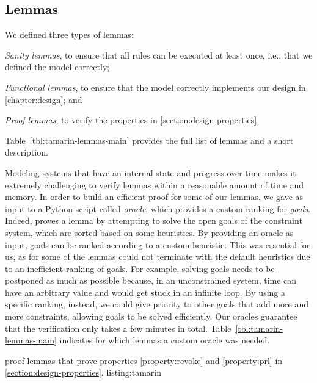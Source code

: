 \subsection{Lemmas}
\label{section:tamarin-lemmas}



We defined three types of lemmas:
%
\begin{paraenum}
  \item \emph{Sanity lemmas}, to ensure that all rules can be executed at least
  once, i.e., that we defined the model correctly;
  \item \emph{Functional lemmas}, to ensure that the model correctly implements
  our design in \cref{chapter:design}; and
  \item \emph{Proof lemmas}, to verify the properties in \cref{section:design-properties}.
\end{paraenum}
%
Table~\ref{tbl:tamarin-lemmas-main} provides the full list of lemmas and a short
description.

Modeling systems that have an internal state and progress over time makes it
extremely challenging to verify lemmas within a reasonable amount of time and
memory. In order to build an efficient proof for some of our lemmas, we gave as
input to \tamarin{} a Python script called \emph{oracle}, which provides a
custom ranking for \emph{goals}. Indeed, \tamarin{} proves a lemma by attempting
to solve the open goals of the constraint system, which are sorted based on some
heuristics. By providing an oracle as input, goals can be ranked according to a
custom heuristic. This was essential for us, as for some of the lemmas
\tamarin{} could not terminate with the default heuristics due to an inefficient
ranking of goals. For example, solving  goals needs to be
postponed as much as possible because, in an unconstrained system, time can have
an arbitrary value and \tamarin{} would get stuck in an infinite loop. By using
a specific ranking, instead, we could give priority to other goals that add more
and more constraints, allowing  goals to be solved
efficiently. Our oracles guarantee that the verification only takes a few
minutes in total. Table~\ref{tbl:tamarin-lemmas-main} indicates for which lemmas a
custom oracle was needed.

%
{\tamarin{} proof lemmas that prove properties \ref{property:revoke}
and \ref{property:prl} in \cref{section:design-properties}.}%
{listing:tamarin} 

